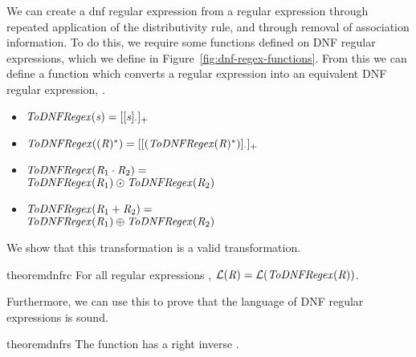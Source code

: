 
We can create a dnf regular expression from a regular expression through repeated
application of the distributivity rule, and through removal of association information.  To do this, we require some functions defined on DNF regular expressions,
which we define in Figure~\ref{fig:dnf-regex-functions}.
From this we can define a function which converts a regular expression into
an equivalent DNF regular expression, \ToDNFRegex{}.  
\begin{definition}
\leavevmode
\begin{itemize}
\item $\mathit{ToDNFRegex}(\mathit{s})=[[\mathit{s}]_{\cdot}]_{+}$
\item $\mathit{ToDNFRegex}((\mathit{R})^*) = [[(\mathit{ToDNFRegex}(\mathit{R})^*)]_{\cdot}]_{+}$
\item $\mathit{ToDNFRegex}(\mathit{R}_1\cdot\mathit{R}_2) =$\\
\hspace*{1em}$\mathit{ToDNFRegex}(\mathit{R}_1)\odot\mathit{ToDNFRegex}(\mathit{R}_2)$
\item $\mathit{ToDNFRegex}(\mathit{R}_1+\mathit{R}_2) =$\\
\hspace*{1em}$\mathit{ToDNFRegex}(\mathit{R}_1)\oplus\mathit{ToDNFRegex}(\mathit{R}_2)$
\end{itemize}
\end{definition}
We show that this transformation is a valid transformation.
\begin{restatable}{theorem}{dnfrc}
\label{thm:completeness-dnf-lenses}
For all regular expressions \Regex{},
$\mathcal{L}(\mathit{R})=\mathcal{L}(\mathit{ToDNFRegex}(\mathit{R}))$.
\end{restatable}

Furthermore, we can use this to prove that the language of DNF regular expressions is sound.

\begin{restatable}{theorem}{dnfrs}
\label{thm:soundness-dnf-lenses}
The function \ToDNFRegex{} has a right inverse \FromDNFRegex{}.
\end{restatable}

